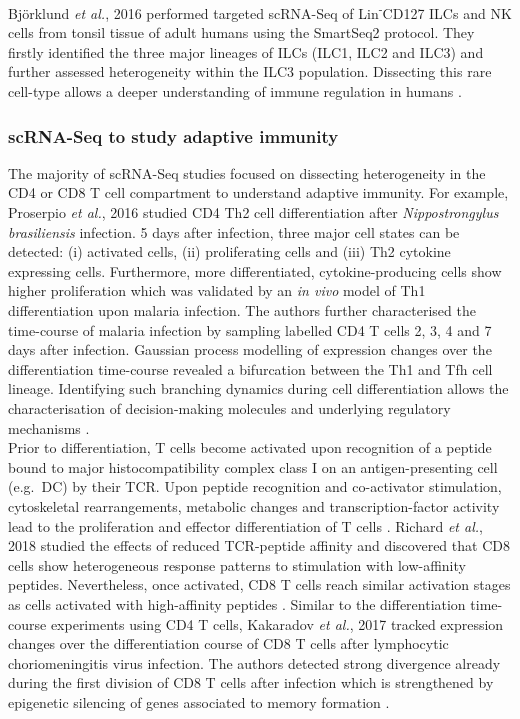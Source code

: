Bj\"o{}rklund \emph{et al.}, 2016 performed targeted scRNA-Seq of Lin\textsuperscript{-}CD127\plus{} \glspl{ILC} and NK cells from tonsil tissue of adult humans using the SmartSeq2 protocol. They firstly identified the three major lineages of ILCs (ILC1, ILC2 and ILC3) and further assessed heterogeneity within the ILC3 population. Dissecting this rare cell-type allows a deeper understanding of immune regulation in humans \citep{Bjorklund2016}. 

\subsubsection{scRNA-Seq to study adaptive immunity}

The majority of scRNA-Seq studies focused on dissecting heterogeneity in the CD4\plus{} or CD8\plus{} T cell compartment to understand adaptive immunity. For example, Proserpio \emph{et al.}, 2016 studied CD4\plus{} Th2 cell differentiation after \textit{Nippostrongylus brasiliensis} infection. 5 days after infection, three major cell states can be detected: (i) activated cells, (ii) proliferating cells and (iii) Th2 cytokine expressing cells. Furthermore, more differentiated, cytokine-producing cells show higher proliferation which was validated by an \emph{in vivo} model of Th1 differentiation upon malaria infection\citep{Proserpio2016}. The authors further characterised the time-course of malaria infection by sampling labelled CD4\plus{} T cells 2, 3, 4 and 7 days after infection. Gaussian process modelling of expression changes over the differentiation time-course revealed a bifurcation between the Th1 and \gls{Tfh} cell lineage. Identifying such branching dynamics during cell differentiation allows the characterisation of decision-making molecules and underlying regulatory mechanisms \citep{Lonnberg2017}. \\

Prior to differentiation, T cells become activated upon recognition of a peptide bound to major histocompatibility complex class I on an antigen-presenting cell (e.g.~DC) by their \gls{TCR}. Upon peptide recognition and co-activator stimulation, cytoskeletal rearrangements, metabolic changes and transcription-factor activity lead to the proliferation and effector differentiation of T cells \citep{Richard2018}. Richard \emph{et al.}, 2018 studied the effects of reduced TCR-peptide affinity and discovered that CD8\plus{} cells show heterogeneous response patterns to stimulation with low-affinity peptides. Nevertheless, once activated, CD8\plus{} T cells reach similar activation stages as cells activated with high-affinity peptides \citep{Richard2018}. Similar to the differentiation time-course experiments using CD4\plus{} T cells, Kakaradov \emph{et al.}, 2017 tracked expression changes over the differentiation course of CD8\plus{} T cells after lymphocytic choriomeningitis virus infection. The authors detected strong divergence already during the first division of CD8\plus{} T cells after infection which is strengthened by epigenetic silencing of genes associated to memory formation \citep{Kakaradov2017}.\\

